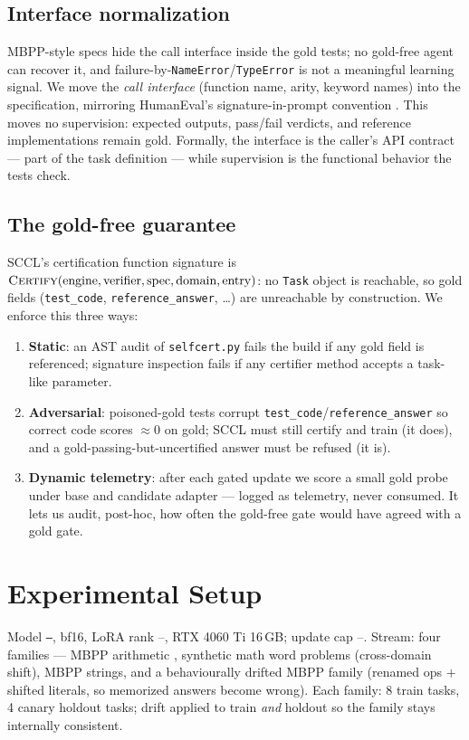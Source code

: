 \documentclass[10pt,conference]{IEEEtran}
\newcommand{\modelName}{--}\newcommand{\loraRank}{--}\newcommand{\maxUpdates}{--}}
\begin{document}
\subsection{Interface normalization}
\label{sec:goldfree}
MBPP-style specs hide the call interface inside the gold tests; no gold-free agent can recover it, and failure-by-\texttt{NameError}/\texttt{TypeError} is not a meaningful learning signal. We move the \emph{call interface} (function name, arity, keyword names) into the specification, mirroring HumanEval's signature-in-prompt convention \cite{chen2023humaneval}. This moves no supervision: expected outputs, pass/fail verdicts, and reference implementations remain gold. Formally, the interface is the caller's API contract --- part of the task definition --- while supervision is the functional behavior the tests check.

\subsection{The gold-free guarantee}
SCCL's certification function signature is $\textsc{Certify}(\text{engine}, \text{verifier}, \text{spec}, \text{domain}, \text{entry})$: no \texttt{Task} object is reachable, so gold fields (\texttt{test\_code}, \texttt{reference\_answer}, \dots) are unreachable by construction. We enforce this three ways:
\begin{enumerate}
\item \textbf{Static}: an AST audit of \texttt{selfcert.py} fails the build if any gold field is referenced; signature inspection fails if any certifier method accepts a task-like parameter.
\item \textbf{Adversarial}: poisoned-gold tests corrupt \texttt{test\_code}/\texttt{reference\_answer} so correct code scores $\approx 0$ on gold; SCCL must still certify and train (it does), and a gold-passing-but-uncertified answer must be refused (it is).
\item \textbf{Dynamic telemetry}: after each gated update we score a small gold probe under base and candidate adapter --- logged as telemetry, never consumed. It lets us audit, post-hoc, how often the gold-free gate would have agreed with a gold gate.
\end{enumerate}

\section{Experimental Setup}
\label{sec:setup}
Model \texttt{\modelName}, bf16, LoRA rank \loraRank, RTX 4060 Ti 16\,GB; update cap \maxUpdates. Stream: four families --- MBPP arithmetic \cite{austin2021mbpp}, synthetic math word problems (cross-domain shift), MBPP strings, and a behaviourally drifted MBPP family (renamed ops $+$ shifted literals, so memorized answers become wrong). Each family: 8 train tasks, 4 canary holdout tasks; drift applied to train \emph{and} holdout so the family stays internally consistent.
\end{document}
